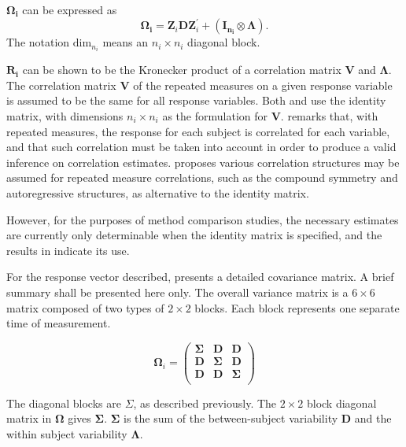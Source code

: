 \documentclass[12pt, a4paper]{report}
\theoremstyle{plain}
\theoremstyle{definition}
\theoremstyle{remark}
\begin{document}
$\boldsymbol{\Omega_{i}}$ can be expressed as
\[
\boldsymbol{\Omega_{i}} = \boldsymbol{Z}_{i}\boldsymbol{D}\boldsymbol{Z}_{i}^\prime + ({\boldsymbol{I_{n_{i}}} \otimes \boldsymbol{\Lambda}}).
\]
The notation $\mbox{dim}_{n_{i}}$ means an $n_{i} \times n_{i}$ diagonal block.

$\boldsymbol{R_{i}}$ can be shown to be the Kronecker product of a correlation matrix $\boldsymbol{V}$ and $\boldsymbol{\Lambda}$. The correlation matrix $\boldsymbol{V}$ of the repeated measures on a given response variable is assumed to be the same for all response variables. Both \citet{hamlett} and \citet{lam} use the identity matrix, with dimensions $n_{i} \times n_{i}$ as the formulation for $\boldsymbol{V}$. \citet{roy} remarks that, with repeated measures, the response for each subject is correlated for each variable, and that such correlation must be taken into account in order to produce a valid inference on correlation estimates.  \citet{roy2006} proposes various correlation structures may be assumed for repeated measure correlations, such as the compound symmetry and autoregressive structures, as alternative to the identity matrix.

However, for the purposes of method comparison studies, the necessary estimates are currently only determinable when the identity matrix is specified, and the results in \citet{roy} indicate its use.

For the response vector described, \citet{hamlett} presents a detailed covariance matrix. A brief summary shall be presented here only. The overall variance matrix is a $6 \times 6$ matrix composed of two types of $2 \times 2$ blocks. Each block represents one separate time of measurement.

\[
\boldsymbol{\Omega}_{i} = \left(
\begin{array}{ccc}
\boldsymbol{\Sigma} & \boldsymbol{D} & \boldsymbol{D}\\
\boldsymbol{D} & \boldsymbol{\Sigma} & \boldsymbol{D}\\
\boldsymbol{D} & \boldsymbol{D} & \boldsymbol{\Sigma}\\
\end{array}\right)
\]

The diagonal blocks are $\Sigma$, as described previously. The $2 \times 2$ block diagonal matrix in $\boldsymbol{\Omega}$ gives $\boldsymbol{\Sigma}$. $\boldsymbol{\Sigma}$ is the sum of the between-subject variability $\boldsymbol{D}$ and the within subject variability $\boldsymbol{\Lambda}$.
\end{document}

